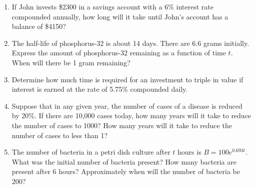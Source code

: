 \documentclass[11pt]{article}
\begin{document}
\begin{enumerate}
        \item If John invests \$2300 in a savings account with a 6\% interest rate compounded annually, how long will it take until John's account has a balance of \$4150?

        \vspace{26ex}

        \item The half-life of phosphorus-32 is about 14 days. There are 6.6 grams initially. Express the amount of phosphorus-32 remaining as a function of time $t$. When will there be 1 gram remaining?

        \vspace{26ex}

        \item Determine how much time is required for an investment to triple in value if interest is earned at the rate of 5.75\% compounded daily.

        \vspace{26ex}

        \item Suppose that in any given year, the number of cases of a disease is reduced by 20\%. If there are 10{,}000 cases today, how many years will it take to reduce the number of cases to 1000? How many years will it take to reduce the number of cases to less than 1?

        \vspace{26ex}

        \item The number of bacteria in a petri dish culture after $t$ hours is $B = 100e^{0.693t}$. What was the initial number of bacteria present? How many bacteria are present after 6 hours? Approximately when will the number of bacteria be 200?

    \end{enumerate}
\end{document}
